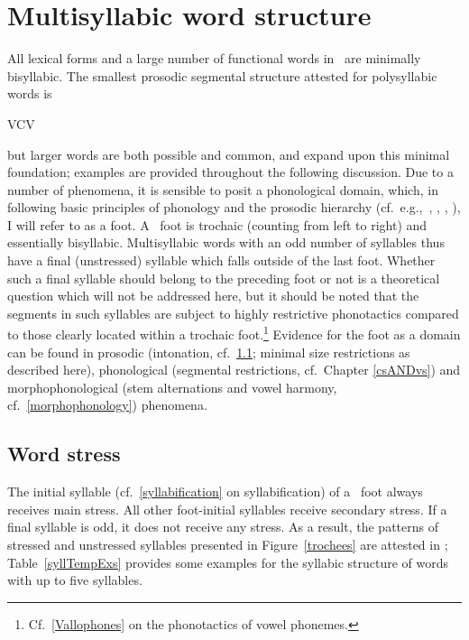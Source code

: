 \section{Multisyllabic word structure}\label{polysyllabicWords}
All lexical forms and a large number of functional words in \PS\ are minimally bisyllabic. The smallest prosodic segmental structure attested for polysyllabic words is \begin{center}VCV\end{center} but larger words are both possible and common, and expand upon this minimal foundation; examples are provided throughout the following discussion. Due to a number of phenomena, it is sensible to posit a phonological domain, which, in following basic principles of phonology %
and the prosodic hierarchy %
(cf.~e.g.,~\citealt[280-283]{dixon2010a}, \citealt{Selkirk1980}, \citealt{Hayes1989}, \citealt{NesporVogel1986}), I will refer to as a {foot}. A \PS\ foot is trochaic (counting from left to right) and essentially bisyllabic. Multisyllabic words with an odd number of syllables thus have a final (unstressed) syllable which falls outside of the last foot. 
Whether such a final syllable should belong to the preceding foot or not is a theoretical question which will not be addressed here, but it should be noted that the segments in such syllables are subject to highly restrictive phonotactics compared to those clearly located within a trochaic foot.\footnote{Cf.~\SEC\ref{Vallophones} on the phonotactics of vowel phonemes.} 
Evidence for the foot as a domain can be found in prosodic (intonation, cf.~\SEC\ref{wordStress}; minimal size restrictions as described here), phonological (segmental restrictions, cf.~Chapter \ref{csANDvs}) and morphophonological (stem alternations and vowel harmony, cf.~\SEC\ref{morphophonology}) phenomena. 



\subsection{Word stress}\label{wordStress}
The initial syllable (cf.~\SEC\ref{syllabification} on syllabification) of a \PS\ foot always receives main stress. All other foot-initial syllables receive secondary stress. If a final syllable is odd, it does not receive any stress. As a result, the patterns of stressed and unstressed syllables presented in Figure~\vref{trochees} are attested in \PS; 
Table~\vref{syllTempExs} provides some examples for the syllabic structure of words with up to five syllables. 

